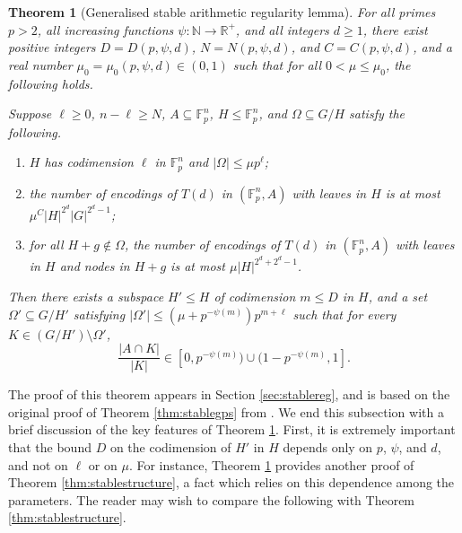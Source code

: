 \documentclass[12pt,oneside,british,a4wide]{amsart}
\newtheorem{theorem}{Theorem}[section]
\numberwithin{equation}{section}
\theoremstyle{definition}
\def\F{\mathbb{F}}
\begin{document}
\begin{theorem}[Generalised stable arithmetic regularity lemma]\label{thm:almoststableinhstrong}
For all primes $p>2$, all increasing functions $\psi:\mathbb{N}\rightarrow \mathbb{R}^+$, and all integers $d\geq 1$, there exist positive integers $D=D(p,\psi,d)$, $N=N(p,\psi,d)$, and $C=C(p,\psi,d)$, and a real number $\mu_0=\mu_0(p,\psi,d)\in (0,1)$   such that for all $0<\mu\leq \mu_0$, the following holds.

Suppose $\ell\geq 0$, $n-\ell \geq N$, $A\subseteq \F_p^n$,  $H\leqslant \F_p^n$, and $\Omega\subseteq G/H$ satisfy the following.
\begin{enumerate}[label=\normalfont(\roman*)]
\item  $H$ has codimension $\ell$ in $\F_p^n$ and $|\Omega|\leq \mu p^{\ell}$;
\item the number of encodings of $T(d)$ in $(\F_p^n, A)$ with leaves in $H$ is at most $\mu^C |H|^{2^d}|G|^{2^d-1}$;
\item for all $H+g\notin \Omega$, the number of encodings of $T(d)$ in $(\F_p^n, A)$ with leaves in $H$ and nodes in $H+g$ is at most $\mu |H|^{2^d+2^d-1}$. 
\end{enumerate}
Then there exists a subspace $H'\leqslant H$ of codimension $m\leq D$ in $H$, and a set $\Omega'\subseteq G/H'$ satisfying $|\Omega'|\leq (\mu +p^{-\psi(m)})p^{m+\ell}$ such that for every $K\in (G/H')\setminus \Omega'$, 
$$
\frac{ |A\cap K|}{|K|}\in [0,p^{-\psi(m)})\cup (1-p^{-\psi(m)},1].
$$
\end{theorem}

The proof of this theorem appears in Section \ref{sec:stablereg}, and is based on the original proof of Theorem \ref{thm:stablegps} from \cite{Terry.2019}.  We end this subsection with a brief discussion of the key features of Theorem \ref{thm:almoststableinhstrong}.  First, it is extremely important that the bound $D$ on the codimension of $H'$ in $H$ depends only on $p$, $\psi$, and $d$, and not on $\ell$ or on $\mu$.  For instance, Theorem \ref{thm:almoststableinhstrong} provides another proof of Theorem \ref{thm:stablestructure}, a fact which relies on this dependence among the parameters.  The reader may wish to compare the following with Theorem \ref{thm:stablestructure}. 
\end{document}
